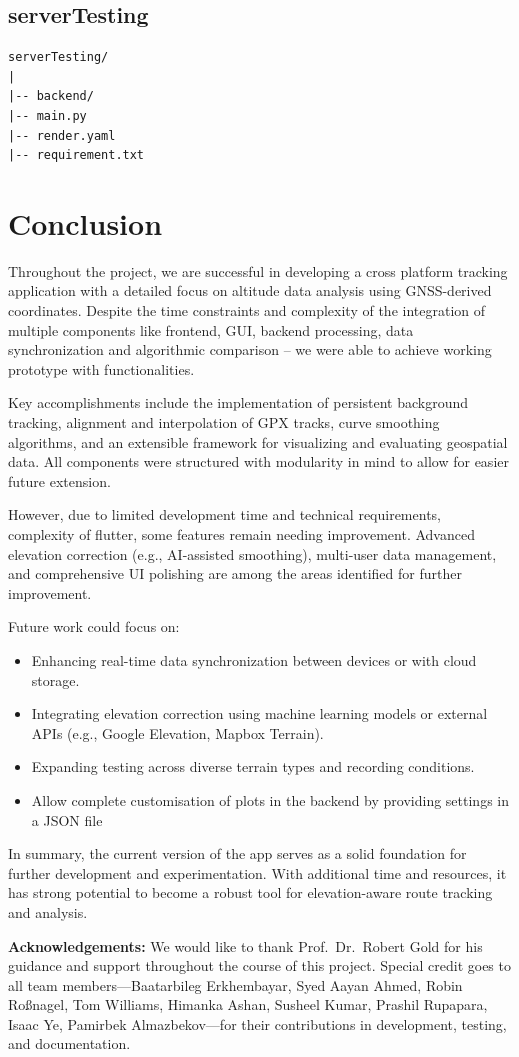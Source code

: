 \documentclass[12pt]{article}
\begin{document}
\subsection*{serverTesting}
\begin{verbatim}
serverTesting/
|
|-- backend/
|-- main.py
|-- render.yaml
|-- requirement.txt

\end{verbatim}

\clearpage
\section{Conclusion}

Throughout the project, we are successful in developing a cross platform tracking application with a detailed focus on altitude data analysis using GNSS-derived coordinates. Despite the time constraints and complexity of the integration of multiple components like frontend, GUI, backend processing, data synchronization and algorithmic comparison -- we were able to achieve working prototype with functionalities. 

Key accomplishments include the implementation of persistent background tracking, alignment and interpolation of GPX tracks, curve smoothing algorithms, and an extensible framework for visualizing and evaluating geospatial data. All components were structured with modularity in mind to allow for easier future extension.

However, due to limited development time and technical requirements, complexity of flutter, some features remain needing improvement. Advanced elevation correction (e.g., AI-assisted smoothing), multi-user data management, and comprehensive UI polishing are among the areas identified for further improvement.

Future work could focus on:
\begin{itemize}
    \item Enhancing real-time data synchronization between devices or with cloud storage.
    \item Integrating elevation correction using machine learning models or external APIs (e.g., Google Elevation, Mapbox Terrain).
    \item Expanding testing across diverse terrain types and recording conditions.
    \item Allow complete customisation of plots in the backend by providing settings in a JSON file

\end{itemize}

In summary, the current version of the app serves as a solid foundation for further development and experimentation. With additional time and resources, it has strong potential to become a robust tool for elevation-aware route tracking and analysis.

\bigskip

\textbf{Acknowledgements:}  
We would like to thank Prof.\ Dr.\ Robert Gold for his guidance and support throughout the course of this project. Special credit goes to all team members—Baatarbileg Erkhembayar, Syed Aayan Ahmed, Robin Roßnagel, Tom Williams, Himanka Ashan, Susheel Kumar, Prashil Rupapara, Isaac Ye, Pamirbek Almazbekov—for their contributions in development, testing, and documentation.
\end{document}
